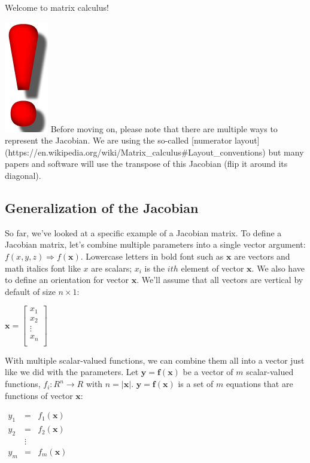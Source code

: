 \documentclass[11pt]{article}
\begin{document}
Welcome to matrix calculus!

\includegraphics[scale=.08]{redbang.png} Before moving on, please note that there are multiple ways to represent the Jacobian. We are using the so-called [numerator layout](https://en.wikipedia.org/wiki/Matrix\_calculus\#Layout\_conventions) but many papers and software will use the transpose of this Jacobian (flip it around its diagonal).

\subsection{Generalization of the Jacobian}

So far, we've looked at a specific example of a Jacobian matrix. To define a Jacobian matrix, let's combine multiple parameters into a single vector argument: $f(x,y,z) \Rightarrow f(\mathbf{x})$. Lowercase letters in bold font such as $\mathbf{x}$ are vectors and math italics font like $x$ are scalars; $x_i$ is the $i{th}$ element of vector $\mathbf{x}$. We also have to define an orientation for vector $\mathbf{x}$. We'll assume that all vectors are vertical by default of size $n \times 1$:

$\mathbf{x} = \begin{bmatrix}
           x_1\\
           x_2\\
           \vdots \\
           x_n\\
           \end{bmatrix}$

With multiple scalar-valued functions, we can combine them all into a vector just like we did with the parameters. Let $\mathbf{y} = \mathbf{f}(\mathbf{x})$ be a vector of $m$ scalar-valued functions, $f_i : R^n \rightarrow R$ with $n=|\mathbf{x}|$. $\mathbf{y} = \mathbf{f}(\mathbf{x})$ is a set of $m$ equations that are functions of vector $\mathbf{x}$:

$
\begin{array}{lcl}
y_1 & = & f_1(\mathbf{x})\\
y_2 & = & f_2(\mathbf{x})\\
 & \vdots & \\
y_m & = & f_m(\mathbf{x})\\
\end{array}
$
\end{document}
